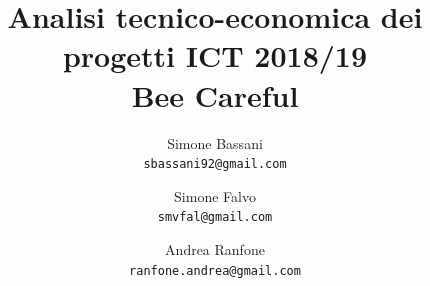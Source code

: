 \documentclass[a4paper,titlepage]{article}
\begin{document}

\title{
  Analisi tecnico-economica dei progetti ICT 2018/19\\[20pt]
  Bee Careful
}
\author{
  Simone Bassani\\
  \texttt{sbassani92@gmail.com}
  \and
  Simone Falvo\\
  \texttt{smvfal@gmail.com}
  \and
  Andrea Ranfone\\
  \texttt{ranfone.andrea@gmail.com}
}

\date{}


\maketitle

%

\tableofcontents
\newpage








\end{document}
